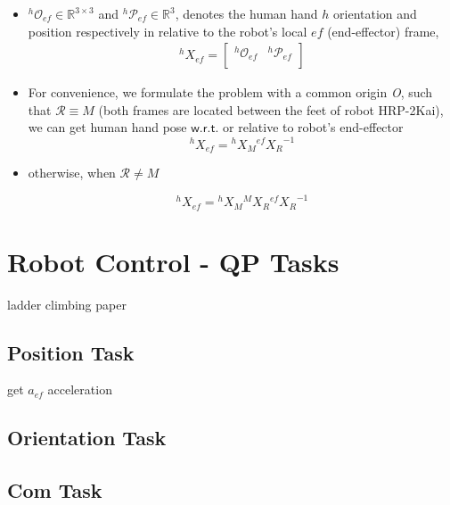 \documentclass[a4paper, 12pt, oneside]{Thesis}  %
\begin{document}
\begin{itemize}
	\item ${{}^{h}\mathcal{O}_{ef}} \in \mathbb{R}^{3\times3}$ and ${{}^{h}\mathcal{P}_{ef}} \in \mathbb{R}^{3}$, denotes the human hand $h$ orientation and position respectively in relative to the robot's local $ef$ (end-effector) frame,
	\begin{gather}\label{X_ef_h}
		{}^{h}{X}_{ef} =
		\left[\begin{array}{cc}
		{}^{h}\mathcal{O}_{ef} & {}^{h}\mathcal{P}_{ef} \\
		\end{array}\right]
	\end{gather}
	
	\item For convenience, we formulate the problem with a common origin {\it O}, such that $\mathcal R \equiv M$ (both frames are located between the feet of robot HRP-2Kai), we can get human hand pose $\mathsf{w.r.t.}$ or relative to robot's end-effector
%	
	\begin{equation}\label{X_ef_h1}
		{}^{h}{X}_{ef} = {}^{h}{X}_{M}  {}^{ef}{X_{R}}^{-1}
	\end{equation}
	\item otherwise, when $\mathcal R \neq M$

	\begin{equation}\label{X_ef_h2}
	{}^{h}{X}_{ef} = {}^{h}{X}_{M}  {}^{M}{X}_R  {}^{ef}{X_{R}}^{-1}
	\end{equation}
	
\end{itemize}




\clearpage

\section{Robot Control - QP Tasks}\label{qpTasks}
ladder climbing paper~\cite{ladder-HRP-2Kai}


\subsection{Position Task}\label{positionTask}
get $a_{ef}$ acceleration 


\subsection{Orientation Task}\label{orientationTask}

\subsection{Com Task}\label{comTask}
\end{document}
